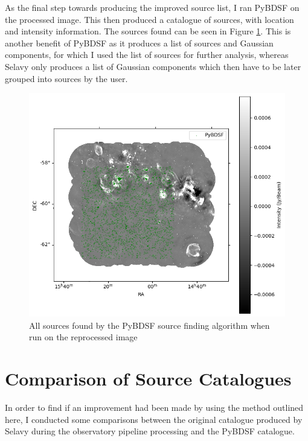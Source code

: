 As the final step towards producing the improved source list, I ran PyBDSF on the processed image. This then produced a catalogue of sources, with location and intensity information. The sources found can be seen in Figure \ref{fig:pybdsf sourcelist}. This is another benefit of PyBDSF as it produces a list of sources and Gaussian components, for which I used the list of sources for further analysis, whereas Selavy only produces a list of Gaussian components which then have to be later grouped into sources by the user.

\begin{figure}
    \centering
    \includegraphics[width=\linewidth]{Thesis_Template/Figures/pybdsf_catalogue_legend.png}
    \caption[All sources found by PyBDSF]{All sources found by the PyBDSF source finding algorithm when run on the reprocessed image}
    \label{fig:pybdsf sourcelist}
\end{figure}


\section{Comparison of Source Catalogues}

In order to find if an improvement had been made by using the method outlined here, I conducted some comparisons between the original catalogue produced by Selavy during the observatory pipeline processing and the PyBDSF catalogue.

